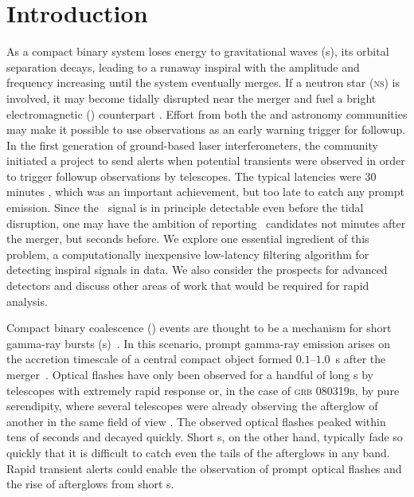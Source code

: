 \section{Introduction}
\label{sec:introduction}

As a compact binary system loses energy to gravitational waves (\GW{}s), its
orbital separation decays, leading to a runaway inspiral with the \GW{}
amplitude and frequency increasing until the system eventually merges.  If a
neutron star (\textsc{ns}) is involved, it may become tidally disrupted near
the merger and fuel a bright electromagnetic (\EM{}) counterpart
\citep{shibata:2007}.  Effort from both the \GW{} and astronomy communities may make it
possible to use \GW{} observations as an early warning trigger for \EM{}
followup. In the first generation of ground-based laser interferometers, the
\GW{} community initiated a project to send alerts when potential \GW{}
transients were observed in order to trigger followup observations by \EM{}
telescopes.  The typical latencies were 30 minutes \citep{HugheyGWPAW2011},
which was an important achievement, but too late to catch any prompt \EM{}
emission.  Since the \GW\ signal is in principle detectable even before the tidal
disruption, one may have the ambition of reporting \GW\ candidates not minutes
after the merger, but seconds before.  We explore one essential ingredient of this
problem, a computationally inexpensive low-latency filtering algorithm for detecting
inspiral signals in \GW{} data.  We also consider the prospects for advanced \GW{}
detectors and discuss other areas of work that would be required for rapid analysis.

Compact binary coalescence (\CBC) events are thought to be a mechanism for
short gamma-ray bursts (\GRB{}s)~\citep{Lee:2005, nakar07}.  In this
scenario, prompt gamma-ray emission arises on the accretion timescale of a
central compact object formed $0.1$--$1.0$~s after the merger~\citep{Janka1999}.
Optical flashes have only been observed for a handful of long \GRB{}s
\citep{2011CRPhy..12..255A} by telescopes with extremely rapid response or, in
the case of \textsc{grb 080319b}, by pure serendipity, where several telescopes
were already observing the afterglow of another \GRB{} in the same field of
view \citep{2008Natur.455..183R}. The observed optical flashes peaked within
tens of seconds and decayed quickly.  Short \GRB{}s, on the other hand,
typically fade so quickly that it is difficult to catch even the tails of the
afterglows in any band. Rapid \GW{} transient alerts could enable the
observation of prompt optical flashes and the rise of afterglows from short
\GRB{}s.


